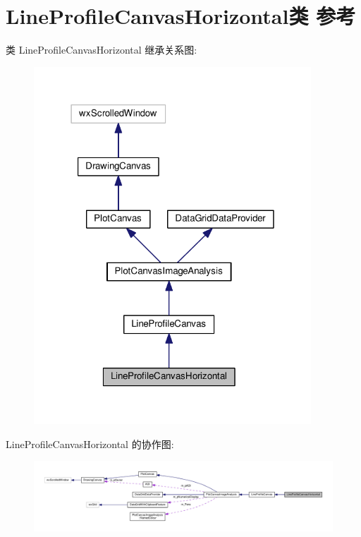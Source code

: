 \hypertarget{class_line_profile_canvas_horizontal}{\section{Line\+Profile\+Canvas\+Horizontal类 参考}
\label{class_line_profile_canvas_horizontal}
}


类 Line\+Profile\+Canvas\+Horizontal 继承关系图\+:
\nopagebreak
\begin{figure}[H]
\begin{center}
\leavevmode
\includegraphics[width=295pt]{class_line_profile_canvas_horizontal__inherit__graph}
\end{center}
\end{figure}


Line\+Profile\+Canvas\+Horizontal 的协作图\+:
\nopagebreak
\begin{figure}[H]
\begin{center}
\leavevmode
\includegraphics[width=350pt]{class_line_profile_canvas_horizontal__coll__graph}
\end{center}
\end{figure}
